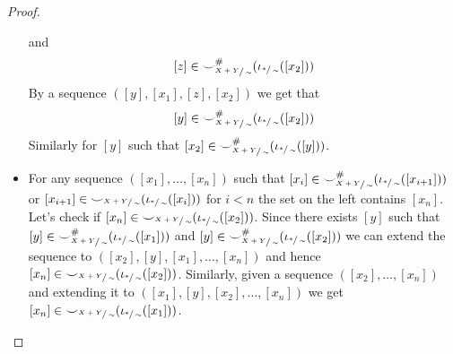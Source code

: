 \begin{proof}
\begin{itemize}
\[              \]
               and
              \[
                [z] \in {\smile}_{\sfrac{X+Y}{\sim}}^{{\#}}(\iota_{\sfrac{*}{\sim}}([x_2]))
              \]
              By a sequence $([y],[x_1],[z],[x_2])$ we get that
              \[
                [y] \in {\smile}_{\sfrac{X+Y}{\sim}}^{{\#}}(\iota_{\sfrac{*}{\sim}}([x_2]))
              \]
              Similarly for $[y]$ such that $[x_2] \in {\smile}_{\sfrac{X+Y}{\sim}}^{{\#}}(\iota_{\sfrac{*}{\sim}}([y]))$.
        \item For any sequence $([x_1],\ldots,[x_n])$ such that $[x_i] \in {\smile}_{\sfrac{X+Y}{\sim}}^{{\#}}(\iota_{\sfrac{*}{\sim}}([x_{i+1}]))$ or $[x_{i+1}] \in {\smile}_{\sfrac{X+Y}{\sim}}(\iota_{\sfrac{*}{\sim}}([x_{i}]))$ for $i < n$ the set on the left contains $[x_n]$.
              Let's check if $[x_n] \in {\smile}_{\sfrac{X+Y}{\sim}}(\iota_{\sfrac{*}{\sim}}([x_2]))$.
              Since there exists $[y]$ such that $[y] \in {\smile}_{\sfrac{X+Y}{\sim}}^{{\#}}(\iota_{\sfrac{*}{\sim}}([x_1]))$ and $[y] \in {\smile}_{\sfrac{X+Y}{\sim}}^{{\#}}(\iota_{\sfrac{*}{\sim}}([x_2]))$ we can extend the sequence to $([x_2],[y],[x_1],\ldots,[x_n])$ and hence $[x_n] \in {\smile}_{\sfrac{X+Y}{\sim}}(\iota_{\sfrac{*}{\sim}}([x_2]))$.
              Similarly, given a sequence $([x_2],\ldots, [x_n])$ and extending it to $([x_1],[y],[x_2],\ldots,[x_n])$ we get $[x_n] \in {\smile}_{\sfrac{X+Y}{\sim}}(\iota_{\sfrac{*}{\sim}}([x_1]))$.
    \end{itemize}
\end{proof}


